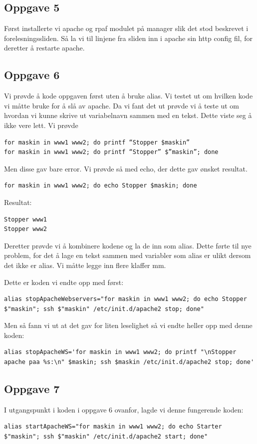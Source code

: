 \documentclass[a4paper, norsk, 12pt]{article}
\begin{document}
\subsection{Oppgave 5}
Først installerte vi apache og rpaf modulet på manager slik det stod beskrevet i forelesningssliden. Så la vi til linjene fra sliden inn i apache sin http config fil, for deretter å restarte apache.

\subsection{Oppgave 6}
Vi prøvde å kode oppgaven først uten å bruke alias. Vi testet ut om hvilken kode vi måtte bruke for å slå av apache. Da vi fant det ut prøvde vi å teste ut om hvordan vi kunne skrive ut variabelnavn sammen med en tekst. Dette viste seg å ikke vere lett. Vi prøvde
\begin{verbatim}
for maskin in www1 www2; do printf “Stopper $maskin”
for maskin in www1 www2; do printf “Stopper” $”maskin”; done
\end{verbatim}
Men disse gav bare error. Vi prøvde så med echo, der dette gav ønsket resultat.
\begin{verbatim}
for maskin in www1 www2; do echo Stopper $maskin; done
\end{verbatim}
  Resultat:     
\begin{verbatim}
Stopper www1
Stopper www2
\end{verbatim}

Deretter prøvde vi å kombinere kodene og la de inn som alias. Dette førte til nye problem, for det å lage en tekst sammen med variabler som alias er ulikt dersom det ikke er alias. Vi måtte legge inn flere klaffer mm.

Dette er koden vi endte opp med først:
\begin{verbatim}
alias stopApacheWebservers="for maskin in www1 www2; do echo Stopper $"maskin"; ssh $"maskin" /etc/init.d/apache2 stop; done"
\end{verbatim}

Men så fann vi ut at det gav for liten leselighet så vi endte heller opp med denne koden:
\begin{verbatim}
alias stopApacheWS='for maskin in www1 www2; do printf "\nStopper apache paa %s:\n" $maskin; ssh $maskin /etc/init.d/apache2 stop; done'
\end{verbatim}

\subsection{Oppgave 7}
I utgangspunkt i koden i oppgave 6 ovanfor, lagde vi denne fungerende koden:
\begin{verbatim}
alias startApacheWS="for maskin in www1 www2; do echo Starter $"maskin"; ssh $"maskin" /etc/init.d/apache2 start; done"
\end{verbatim}
\end{document}
